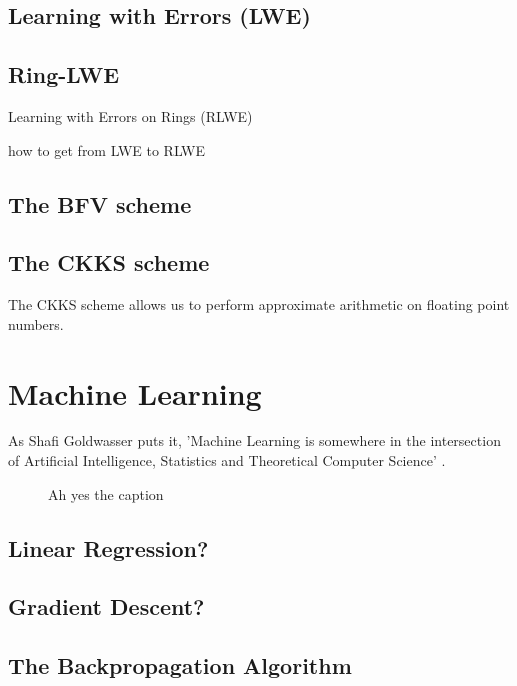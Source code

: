 \subsection{Learning with Errors (LWE)}

\subsection{Ring-LWE}
Learning with Errors on Rings (RLWE)

how to get from LWE to RLWE

\subsection{The BFV scheme}
\subsection{The CKKS scheme}
The CKKS scheme allows us to perform approximate arithmetic on floating point numbers.

\section{Machine Learning}
As Shafi Goldwasser puts it, 'Machine Learning is somewhere in the intersection of Artificial Intelligence, Statistics and Theoretical Computer Science' \cite{goldwasserTalk2018}.

\begin{figure}
  \centering
  \caption{Ah yes the caption}
\end{figure}

\subsection{Linear Regression?}
\subsection{Gradient Descent?}
\subsection{The Backpropagation Algorithm}

